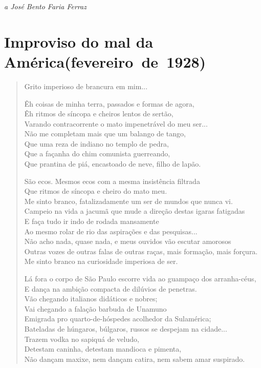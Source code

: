 \begin{flushright}
\emph{a José Bento Faria Ferraz}
\end{flushright}


\section{Improviso do mal da América\break (fevereiro~de~1928)}

\begin{verse}
Grito imperioso de brancura em mim...

Êh coisas de minha terra, passados e formas de agora,\\
Êh ritmos de síncopa e cheiros lentos de sertão,\\
Varando contracorrente o mato impenetrável do meu ser...\\
Não me completam mais que um balango de tango,\\
Que uma reza de indiano no templo de pedra,\\
Que a façanha do chim comunista guerreando,\\
Que prantina de piá, encastoado de neve, filho de lapão.

São ecos. Mesmos ecos com a mesma insistência filtrada\\
Que ritmos de síncopa e cheiro do mato meu.\\
Me sinto branco, fatalizadamente um ser de mundos que nunca vi.\\
Campeio na vida a jacumã que mude a direção destas igaras fatigadas\\
E faça tudo ir indo de rodada mansamente\\
Ao mesmo rolar de rio das aspirações e das pesquisas...\\
Não acho nada, quase nada, e meus ouvidos vão escutar amorosos\\
Outras vozes de outras falas de outras raças, mais formação, mais forçura.\\
Me sinto branco na curiosidade imperiosa de ser.

Lá fora o corpo de São Paulo escorre vida ao guampaço dos arranha-céus,\\
E dança na ambição compacta de dilúvios de penetras.\\
Vão chegando italianos didáticos e nobres;\\
Vai chegando a falação barbuda de Unamuno\\
Emigrada pro quarto-de-hóspedes acolhedor da Sulamérica;\\
Bateladas de húngaros, búlgaros, russos se despejam na cidade...\\
Trazem vodka no sapiquá de veludo,\\
Detestam caninha, detestam mandioca e pimenta,\\
Não dançam maxixe, nem dançam catira, nem sabem amar suspirado.


\end{verse}
